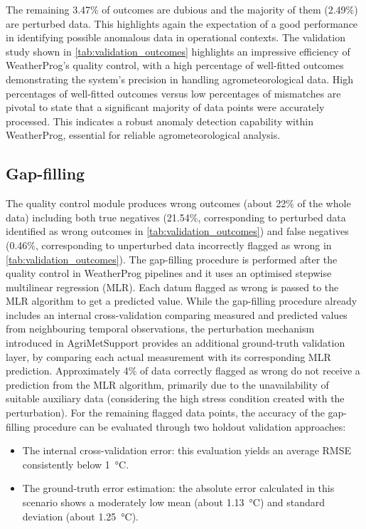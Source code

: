 \documentclass[authoryear,preprint,review,12pt]{elsarticle}
\begin{document}
The remaining 3.47\% of outcomes are dubious and the majority of them (2.49\%) are perturbed data. This highlights again the expectation of a good performance in identifying possible anomalous data in operational contexts.
The validation study shown in \cref{tab:validation_outcomes} highlights an impressive efficiency of WeatherProg's quality control, with a high percentage of well-fitted outcomes demonstrating the system's precision in handling agrometeorological data. 
High percentages of well-fitted outcomes versus low percentages of mismatches are pivotal to state that a significant majority of data points were accurately processed. 
This indicates a robust anomaly detection capability within WeatherProg, essential for reliable agrometeorological analysis.

\subsection{Gap-filling}
The quality control module produces wrong outcomes (about 22\% of the whole data) including both true negatives (21.54\%, corresponding to perturbed data identified as wrong outcomes in \cref{tab:validation_outcomes}) and false negatives (0.46\%, corresponding to unperturbed data incorrectly flagged as wrong in \cref{tab:validation_outcomes}).
The gap-filling procedure is performed after the quality control in WeatherProg pipelines and it uses an optimised stepwise multilinear regression (MLR).
Each datum flagged as wrong is passed to the MLR algorithm to get a predicted value.
While the gap-filling procedure already includes an internal cross-validation comparing measured and predicted values from neighbouring temporal observations, the perturbation mechanism introduced in AgriMetSupport provides an additional ground-truth validation layer, 
by comparing each actual measurement with its corresponding MLR prediction. %
Approximately 4\% of data correctly flagged as wrong do not receive a prediction from the MLR algorithm, primarily due to the unavailability of suitable auxiliary data (considering the high stress condition created with the perturbation).
For the remaining flagged data points, the accuracy of the gap-filling procedure can be evaluated through two holdout validation approaches:
\begin{itemize}
    \item The internal cross-validation error: this evaluation yields an average RMSE consistently below \SI{1}{\degreeCelsius}. %
    \item The ground-truth error estimation: the absolute error calculated in this scenario shows a moderately low mean (about \SI{1.13}{\degreeCelsius}) and standard deviation (about \SI{1.25}{\degreeCelsius}). %
\end{itemize}
\end{document}
